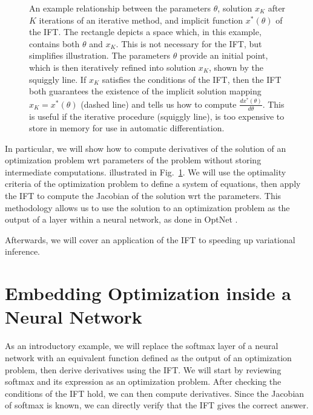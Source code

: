 \documentclass[11pt]{article}
\begin{document}
\begin{figure}
\centering
{}
\caption{
\label{fig:optift}
An example relationship between the parameters $\theta$,
solution $x_{K}$ after $K$ iterations of an iterative method,
and implicit function $x^*(\theta)$ of the IFT.
The rectangle depicts a space which, in this example,
contains both $\theta$ and $x_K$.
This is not necessary for the IFT, but simplifies illustration.
The parameters $\theta$ provide an initial point, which is then iteratively refined
into solution $x_{K}$, shown by the squiggly line.
If $x_{K}$ satisfies the conditions of the IFT, then the IFT both
guarantees the existence of the implicit solution mapping $x_K = x^*(\theta)$
(dashed line)
and tells us how to compute $\frac{dx^*(\theta)}{d\theta}$.
This is useful if the iterative procedure (squiggly line), is too expensive
to store in memory for use in automatic differentiation.
}
\end{figure}

In particular, we will show how to compute derivatives of the solution of an optimization problem
wrt parameters of the problem without storing intermediate computations.
illustrated in Fig.~\ref{fig:optift}.
We will use the optimality criteria of the optimization problem to define a system of equations,
then apply the IFT to compute the Jacobian of the solution wrt the parameters.
This methodology allows us to use the solution to an optimization problem
as the output of a layer within a neural network,
as done in OptNet \citep{optnet}.

Afterwards, we will cover an application of the IFT to speeding up variational inference.

\section{Embedding Optimization inside a Neural Network}
As an introductory example,
we will replace the softmax layer of a neural network with an equivalent function
defined as the output of an optimization problem, then derive derivatives using the IFT.
We will start by reviewing softmax and its expression as an optimization problem.
After checking the conditions of the IFT hold, we can then compute derivatives.
Since the Jacobian of softmax is known, we can directly verify that the IFT gives
the correct answer.
\end{document}
